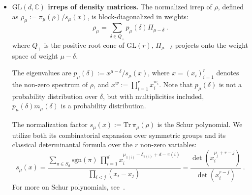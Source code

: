 \documentclass[a4paper,onecolumn,11pt]{quantumarticle}
\newtheorem{lem}{Lemma}
\def\h{\mathcal{H}}
\newcommand*{\Tr}{\mathrm{Tr}}
\begin{document}
\begin{itemize}
The finite-dimensional irrep $\h_\lambda$ is the unique irreducible quotient of the Verma module $M(\lambda)$. The kernel of the projection map $M(\lambda) \to \h_\lambda$ is generated by singular vectors that appear at depth $\langle \lambda, \alpha_i^\vee \rangle + 1$ for each simple root $\alpha_i$. Therefore, for shallow weight offsets satisfying $|\delta| \le \min_i \langle \lambda, \alpha_i^\vee \rangle$, no states are quotiented out. In this regime, the weight spaces of $\h_\lambda$ are perfectly isomorphic to those of $M(\lambda)$, yielding an inner degeneracy exactly equal to $K(\delta)$. We rely on this equivalence for the multiplicities in the shallow-depth regime.

\begin{lem}[Kostka Numbers]\label{lem:kostka}
    Let $\mu,\omega$ be dominant integral highest weights of $\mathrm{GL}(d,\mathbb C)$, let $\delta\in Q_+$ be a weight offset, and let $g_\mu:= \min_{1\le i\le d-1}(\mu_i-\mu_{i+1})$ be the edge gap of $\mu$. Then the inner degeneracies (Kostka numbers) satisfy
    \begin{equation}
        K_{\mu,\mu-\delta} \le K_{\mu+\omega,\mu+\omega-\delta}.
    \end{equation}
    Moreover, equality holds when $|\delta|\le g_\mu$.
\end{lem}
\begin{proof}See Appendix~\ref{app:proofs}. \end{proof}

\item\textbf{$\mathrm{GL}(d,\mathbb C)$ irreps of density matrices.} 
The normalized irrep of $\rho$, defined as $\rho_\mu := \pi_\mu(\rho)/s_\mu(x)$, is block-diagonalized in weights: 
\begin{equation}
    \rho_\mu = \sum_{\delta\in Q_+} p_\mu(\delta) \Pi_{\mu-\delta} \ .
\end{equation}
where \(Q_+\) is the positive root cone of \(\mathrm{GL}(r)\), \(\Pi_{\mu-\delta}\) projects onto the weight space of weight \(\mu-\delta\). 

The eigenvalues are $p_\mu(\delta) := x^{\mu-\delta}/s_\mu(x)$, where $x=(x_i)_{i=1}^r$ denotes the non-zero spectrum of $\rho$, and $x^w := \prod_{i=1}^r x_i^{w_i}$. Note that $p_\mu(\delta)$ is not a probability distribution over $\delta$, but with multiplicities included,  $p_\mu(\delta)m_\mu(\delta)$  is a probability distribution.

The normalization factor $s_{\mu}(x) := \Tr\, \pi_{\mu}(\rho)$ is the Schur polynomial. We utilize both its combinatorial expansion over symmetric groups and its classical determinantal formula over the $r$ non-zero variables:
\begin{equation}
    s_\mu(x) = \frac{\sum_{\pi\in S_d} \mathrm{sgn}(\pi)\ \prod_{i=1}^d x_i^{\mu_{\pi(i)}-\delta_{\pi(i)}+d-\pi(i)}}{\prod_{i<j}(x_i-x_j)} = \frac{\det(x_i^{\mu_j+r-j})}{\det(x_i^{r-j})} \ .
\end{equation}
For more on Schur polynomials, see~\cite{macdonald1995symmetric}.




\end{itemize}
\end{document}
